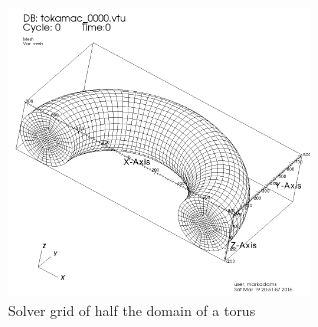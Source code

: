 \documentclass[review]{siamart}
\begin{document}
\begin{figure}[h!]
   \centering
   \includegraphics[width=80mm]{half_grid_mesh.jpeg} 
   \caption{Solver grid of half the domain of a torus}
   \label{fig:mesh}
\end{figure}






 
\end{document}

